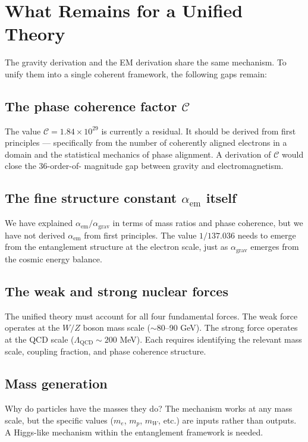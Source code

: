 \documentclass[11pt,letterpaper]{article}
\begin{document}
\section{What Remains for a Unified Theory}

The gravity derivation and the EM derivation share the same mechanism. To
unify them into a single coherent framework, the following gaps remain:

\subsection{The phase coherence factor $\mathcal{C}$}

The value $\mathcal{C} = 1.84 \times 10^{29}$ is currently a residual. It
should be derived from first principles --- specifically from the number of
coherently aligned electrons in a domain and the statistical mechanics of
phase alignment. A derivation of $\mathcal{C}$ would close the 36-order-of-
magnitude gap between gravity and electromagnetism.

\subsection{The fine structure constant $\alpha_{\mathrm{em}}$ itself}

We have explained $\alpha_{\mathrm{em}}/\alpha_{\mathrm{grav}}$ in terms of
mass ratios and phase coherence, but we have not derived $\alpha_{\mathrm{em}}$
from first principles. The value $1/137.036$ needs to emerge from the
entanglement structure at the electron scale, just as $\alpha_{\mathrm{grav}}$
emerges from the cosmic energy balance.

\subsection{The weak and strong nuclear forces}

The unified theory must account for all four fundamental forces. The weak
force operates at the $W/Z$ boson mass scale ($\sim 80$--90 GeV). The strong
force operates at the QCD scale ($\Lambda_{\mathrm{QCD}} \sim 200$ MeV). Each
requires identifying the relevant mass scale, coupling fraction, and phase coherence
structure.

\subsection{Mass generation}

Why do particles have the masses they do? The mechanism works at any mass
scale, but the specific values ($m_e$, $m_p$, $m_W$, etc.) are inputs rather
than outputs. A Higgs-like mechanism within the entanglement framework is
needed.
\end{document}
